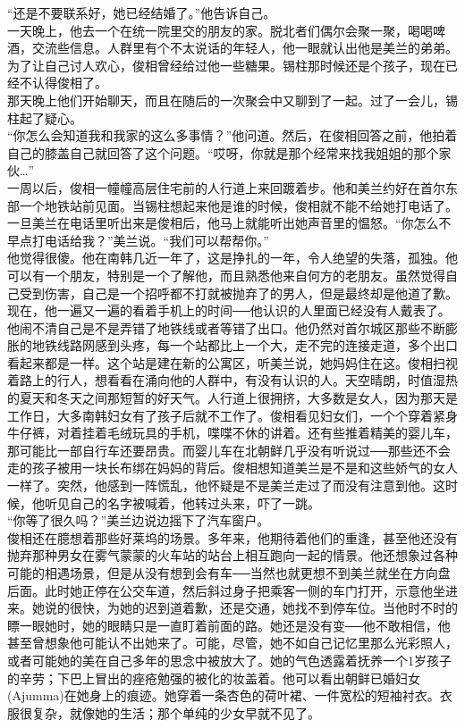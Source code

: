 “还是不要联系好，她已经结婚了。”他告诉自己。\\

一天晚上，他去一个在统一院里交的朋友的家。脱北者们偶尔会聚一聚，喝喝啤酒，交流些信息。人群里有个不太说话的年轻人，他一眼就认出他是美兰的弟弟。为了让自己讨人欢心，俊相曾经给过他一些糖果。锡柱那时候还是个孩子，现在已经不认得俊相了。\\

那天晚上他们开始聊天，而且在随后的一次聚会中又聊到了一起。过了一会儿，锡柱起了疑心。\\

“你怎么会知道我和我家的这么多事情？”他问道。然后，在俊相回答之前，他拍着自己的膝盖自己就回答了这个问题。“哎呀，你就是那个经常来找我姐姐的那个家伙…”\\

一周以后，俊相一幢幢高层住宅前的人行道上来回踱着步。他和美兰约好在首尔东部一个地铁站前见面。当锡柱想起来他是谁的时候，俊相就不能不给她打电话了。一旦美兰在电话里听出来是俊相后，他马上就能听出她声音里的愠怒。“你怎么不早点打电话给我？”美兰说。“我们可以帮帮你。”\\

他觉得很傻。他在南韩几近一年了，这是挣扎的一年，令人绝望的失落，孤独。他可以有一个朋友，特别是一个了解他，而且熟悉他来自何方的老朋友。虽然觉得自己受到伤害，自己是一个招呼都不打就被抛弃了的男人，但是最终却是他道了歉。\\

现在，他一遍又一遍的看着手机上的时间──他认识的人里面已经没有人戴表了。他闹不清自己是不是弄错了地铁线或者等错了出口。他仍然对首尔城区那些不断膨胀的地铁线路网感到头疼，每一个站都比上一个大，走不完的连接走道，多个出口看起来都是一样。这个站是建在新的公寓区，听美兰说，她妈妈住在这。俊相扫视着路上的行人，想看看在涌向他的人群中，有没有认识的人。天空晴朗，时值湿热的夏天和冬天之间那短暂的好天气。人行道上很拥挤，大多数是女人，因为那天是工作日，大多南韩妇女有了孩子后就不工作了。俊相看见妇女们，一个个穿着紧身牛仔裤，对着挂着毛绒玩具的手机，喋喋不休的讲着。还有些推着精美的婴儿车，那可能比一部自行车还要昂贵。而婴儿车在北朝鲜几乎没有听说过──那些还不会走的孩子被用一块长布绑在妈妈的背后。俊相想知道美兰是不是和这些娇气的女人一样了。突然，他感到一阵慌乱，他怀疑是不是美兰走过了而没有注意到他。这时候，他听见自己的名字被喊着，他转过头来，吓了一跳。\\

“你等了很久吗？”美兰边说边摇下了汽车窗户。\\

俊相还在臆想着那些好莱坞的场景。多年来，他期待着他们的重逢，甚至他还没有抛弃那种男女在雾气蒙蒙的火车站的站台上相互跑向一起的情景。他还想象过各种可能的相遇场景，但是从没有想到会有车──当然也就更想不到美兰就坐在方向盘后面。此时她正停在公交车道，然后斜过身子把乘客一侧的车门打开，示意他坐进来。她说的很快，为她的迟到道着歉，还是交通，她找不到停车位。当他时不时的瞟一眼她时，她的眼睛只是一直盯着前面的路。她还是没有变──他不敢相信，他甚至曾想象他可能认不出她来了。可能，尽管，她不如自己记忆里那么光彩照人，或者可能她的美在自己多年的思念中被放大了。她的气色透露着抚养一个1岁孩子的辛劳；下巴上冒出的痤疮勉强的被化的妆盖着。他可以看出朝鲜已婚妇女(Ajumma)在她身上的痕迹。她穿着一条杏色的荷叶裙、一件宽松的短袖衬衣。衣服很复杂，就像她的生活；那个单纯的少女早就不见了。\\

